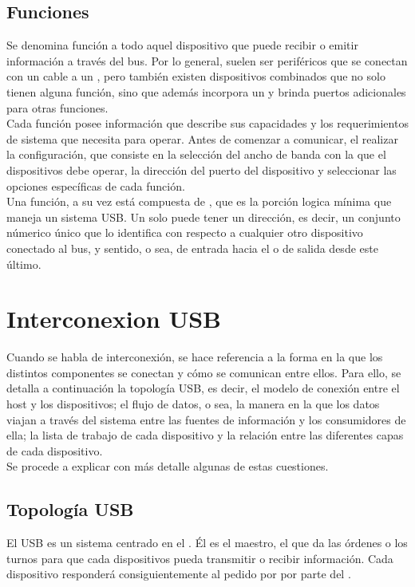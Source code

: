  \subsection{Funciones}
  Se denomina función a todo aquel dispositivo que puede recibir o emitir
  información a través del bus. Por lo general, suelen ser periféricos que se
  conectan con un cable a un \hub, pero también existen dispositivos combinados
  que no solo tienen alguna función, sino que además incorpora un \hub y brinda
  puertos adicionales para otras funciones.\\

  Cada función posee información que describe sus capacidades y los
  requerimientos de sistema que necesita para operar. Antes de comenzar a
  comunicar, el \host realizar la configuración, que consiste en la selección
  del ancho de banda con la que el dispositivos debe operar, la dirección del
  puerto del dispositivo y seleccionar las opciones específicas de cada
  función.\\

  Una función, a su vez está compuesta de \eps, que es la porción logica mínima
  que maneja un sistema USB. Un \ep solo puede tener un dirección, es decir, un
  conjunto númerico único que lo identifica con respecto a cualquier otro
  dispositivo conectado al bus, y sentido, o sea, de entrada hacia el \host o de
  salida desde este último.\\

  \section{Interconexion USB}
  Cuando se habla de interconexión, se hace referencia a la forma en la que los
  distintos componentes se conectan y cómo se comunican entre ellos. Para ello,
  se detalla a continuación la topología USB, es decir, el modelo de conexión
  entre el host y los dispositivos; el flujo de datos, o sea, la manera en la
  que los datos viajan a través del sistema entre las fuentes de información y
  los consumidores de ella; la lista de trabajo de cada dispositivo y la
  relación entre las diferentes capas de cada dispositivo.\\

  Se procede a explicar con más detalle algunas de estas cuestiones.\\

    \subsection{Topología USB}
    El USB es un sistema centrado en el \host. Él es el maestro, el que da las
    órdenes o los turnos para que cada dispositivos pueda transmitir o recibir
    información. Cada dispositivo responderá consiguientemente al pedido por
    por parte del \host.\\

